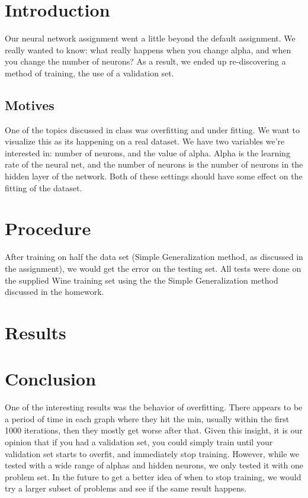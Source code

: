\documentclass[11pt,letterpaper]{article}
\begin{document}
\maketitle

\section{Introduction}
Our neural network assignment went a little beyond the default assignment. We really wanted to know: what really happens when you change alpha, and when you change the number of neurons? As a result, we ended up re-discovering a method of training, the use of a validation set.
\subsection{Motives} One of the topics discussed in class was overfitting and under fitting. We want to visualize this as its happening on a real dataset. We have two variables we're interested in: number of neurons, and the value of alpha. Alpha is the learning rate of the neural net, and the number of neurons is the number of neurons in the hidden layer of the network.  Both of these settings should have some effect on the fitting of the dataset.
\section{Procedure}
After training on half the data set (Simple Generalization method, as discussed in the assignment), we would get the error on the testing set. 
All tests were done on the supplied Wine training set using the the Simple Generalization method discussed in the homework. 
\section{Results}

\section{Conclusion}
One of the interesting results was the behavior of overfitting. There appears to be a period of time in each graph where they hit the min, usually within the first 1000 iterations, then they mostly get worse after that. Given this insight, it is our opinion that if you had a validation set, you could simply train until your validation set starts to overfit, and immediately stop training. However, while we tested with a wide range of alphas and hidden neurons, we only tested it with one problem set. In the future to get a better idea of when to stop training, we would try a larger subset of problems and see if the same result happens.



\end{document}
